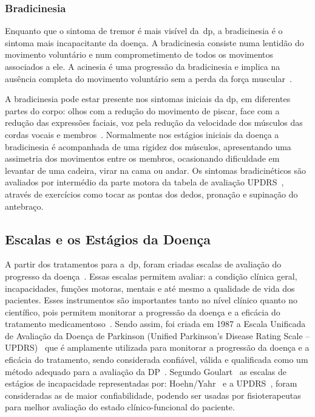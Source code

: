 \subsubsection{Bradicinesia}\label{section:analise_bradicinesia}
Enquanto que o sintoma de tremor é mais visível da~\ac{dp}, a bradicinesia é o sintoma mais incapacitante da doença. A bradicinesia consiste numa lentidão do movimento voluntário e num comprometimento de todos os movimentos associados a ele. A acinesia é uma progressão da bradicinesia e implica na ausência completa do movimento voluntário sem a perda da força muscular~\cite{do2007parkinson}.

A bradicinesia pode estar presente nos sintomas iniciais da \ac{dp}, em diferentes partes do corpo: olhos com a redução do movimento de piscar, face com a redução das expressões faciais, voz pela redução da velocidade dos músculos das cordas vocais e membros~\cite{do2007parkinson}. Normalmente nos estágios iniciais da doença a bradicinesia é acompanhada de uma rigidez dos músculos, apresentando uma assimetria dos movimentos entre os membros, ocasionando dificuldade em levantar de uma cadeira, virar na cama ou andar. Os sintomas bradicinéticos são avaliados por intermédio da parte motora da tabela de avaliação UPDRS~\cite{updrs87}, através de exercícios como tocar as pontas dos dedos, pronação e supinação do antebraço. 

\subsection{Escalas e os Estágios da Doença}\label{section:escalas_avaliacao}
A partir dos tratamentos para a~\ac{dp}, foram criadas escalas de avaliação do progresso da doença~\cite{updrs87,Hoehn_Yahr_2001}. Essas escalas permitem avaliar: a condição clínica geral, incapacidades, funções motoras, mentais e até mesmo a qualidade de vida dos pacientes. Esses instrumentos são importantes tanto no nível clínico quanto no científico, pois permitem monitorar a progressão da doença e a eficácia do tratamento medicamentoso~\cite{updrs87,goul05}.  Sendo assim, foi criada em 1987 a Escala Unificada de Avaliação da  Doença de Parkinson (Unified Parkinson’s Disease Rating Scale – UPDRS)~\cite{updrs87} que é amplamente utilizada para monitorar a progressão da doença e a eficácia do tratamento, sendo considerada confiável, válida e qualificada como um método adequado para a avaliação da DP~\cite{goul05}. Segundo Goulart~\cite{goul05} as escalas de estágios de incapacidade representadas por: Hoehn/Yahr~\cite{Hoehn_Yahr_2001} e a UPDRS~\cite{updrs87}, foram consideradas as de maior confiabilidade, podendo ser usadas por fisioterapeutas para melhor avaliação do estado clínico-funcional do  paciente.%

